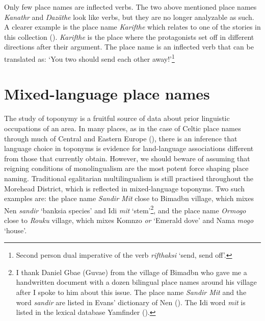 Only few place names are inflected verbs. The two above mentioned place names \textit{Kanathr} and \textit{Ŋazäthe} look like verbs, but they are no longer analyzable as such. A clearer example is the place name \textit{Karifthe} which relates to one of the stories in this collection (). \textit{Karifthe} is the place where the protagonists set off in different directions after their argument. The place name is an inflected verb that can be translated as: `You two should send each other away!'\footnote{Second person dual imperative of the verb \textit{rifthaksi} `send, send off'.}

\section{Mixed-language place names}\label{sec:mixed}

The study of toponymy is a fruitful source of data about prior linguistic occupations of an area. In many places, as in the case of Celtic place names through much of Central and Eastern Europe (\cite{Sims-Williams:2006it}), there is an inference that language choice in toponyms is evidence for land-language associations different from those that currently obtain. However, we should beware of assuming that reigning conditions of monolingualism are the most potent force shaping place naming. Traditional egalitarian multilingualism is still practised throughout the Morehead District, which is reflected in mixed-language toponyms. Two such examples are: the place name \textit{Sandir Mit} close to Bimadbn village, which mixes Nen \textit{sandir} `banksia species' and Idi \textit{mit} `stem'\footnote{I thank Daniel Gbae (Guvae) from the village of Bimadbn who gave me a handwritten document with a dozen bilingual place names around his village after I spoke to him about this issue. The place name \textit{Sandir Mit} and the word \textit{sandir} are listed in Evans' dictionary of Nen (\citeyear{Evans:2019aa}). The Idi word \textit{mit} is listed in the lexical database Yamfinder (\cite{Carroll:2021ta}).}, and the place name \textit{Ormogo} close to \textit{Rouku} village, which mixes Komnzo \textit{or} `Emerald dove' and Nama \textit{mogo} `house'.

